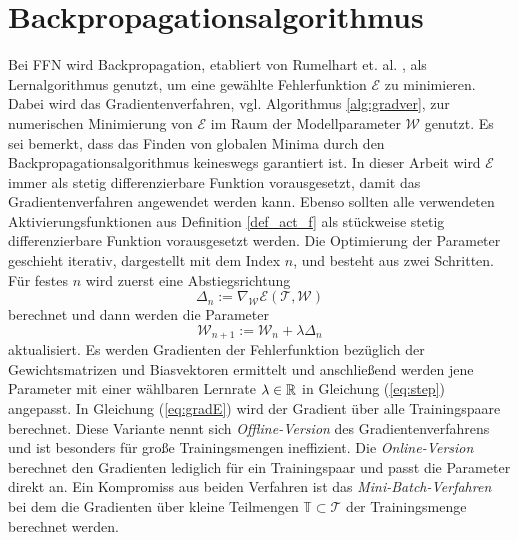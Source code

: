 

 \section*{Backpropagationsalgorithmus}
Bei FFN wird Backpropagation, etabliert von Rumelhart et. al. \cite{MLPbook}, als Lernalgorithmus genutzt, um eine gewählte Fehlerfunktion $\mathcal{E}$ zu minimieren. Dabei wird das Gradientenverfahren, vgl. Algorithmus \ref{alg:gradver}, zur numerischen Minimierung von $\mathcal{E}$ im Raum der Modellparameter $\mathcal{W}$ genutzt. Es sei bemerkt, dass das Finden von globalen Minima durch den Backpropagationsalgorithmus keineswegs garantiert ist.
In dieser Arbeit wird $\mathcal{E}$ immer als stetig differenzierbare Funktion vorausgesetzt, damit das Gradientenverfahren angewendet werden kann. Ebenso sollten alle verwendeten Aktivierungsfunktionen aus Definition \ref{def_act_f} als stückweise stetig differenzierbare Funktion vorausgesetzt werden. 
Die Optimierung der Parameter geschieht iterativ, dargestellt mit dem Index $n$, und besteht aus zwei Schritten. Für festes $n$ wird zuerst eine Abstiegsrichtung 
\begin{equation}
    \label{eq:gradE}
    \Delta_n := \nabla_{\mathcal{W}} \mathcal{E}(\mathcal{T},\mathcal{W})
\end{equation} 
berechnet und dann werden die Parameter 
\begin{equation}
    \label{eq:step}
    \mathcal{W}_{n+1}:=\mathcal{W}_n + \lambda \Delta_n
\end{equation}
aktualisiert. Es werden Gradienten der Fehlerfunktion bezüglich der Gewichtsmatrizen und Biasvektoren ermittelt und anschließend werden jene Parameter mit einer wählbaren Lernrate $\lambda \in \mathbb{R}$ in Gleichung (\ref{eq:step}) angepasst. In Gleichung (\ref{eq:gradE}) wird der Gradient über alle Trainingspaare berechnet. Diese Variante nennt sich \textit{Offline-Version} des Gradientenverfahrens und ist besonders für große Trainingsmengen ineffizient. Die \textit{Online-Version} berechnet den Gradienten lediglich für ein Trainingspaar und passt die Parameter direkt an. Ein Kompromiss aus beiden Verfahren ist das \textit{Mini-Batch-Verfahren} bei dem die Gradienten über kleine Teilmengen $\mathbb{T} \subset \mathcal{T}$ der Trainingsmenge berechnet werden.
